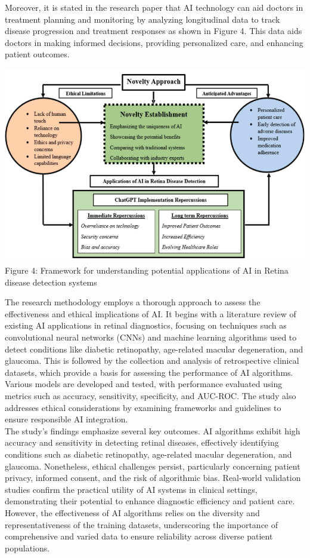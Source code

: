 \documentclass[a4paper, 12pt]{article}
\begin{document}
Moreover, it is stated in the research paper that AI technology can aid doctors in treatment planning and monitoring by analyzing longitudinal data to track disease progression and treatment responses as shown in Figure 4. This data aids doctors in making informed decisions, providing personalized care, and enhancing patient outcomes.

\begin{center}
\includegraphics[scale=0.73]{Figure4.png}\\
\small Figure 4: Framework for understanding potential applications of AI in Retina disease detection systems \normalsize
\end{center}

The research methodology employs a thorough approach to assess the effectiveness and ethical implications of AI. It begins with a literature review of existing AI applications in retinal diagnostics, focusing on techniques such as convolutional neural networks (CNNs) and machine learning algorithms used to detect conditions like diabetic retinopathy, age-related macular degeneration, and glaucoma. This is followed by the collection and analysis of retrospective clinical datasets, which provide a basis for assessing the performance of AI algorithms. Various models are developed and tested, with performance evaluated using metrics such as accuracy, sensitivity, specificity, and AUC-ROC. The study also addresses ethical considerations by examining frameworks and guidelines to ensure responsible AI integration.\\

The study's findings emphasize several key outcomes. AI algorithms exhibit high accuracy and sensitivity in detecting retinal diseases, effectively identifying conditions such as diabetic retinopathy, age-related macular degeneration, and glaucoma. Nonetheless, ethical challenges persist, particularly concerning patient privacy, informed consent, and the risk of algorithmic bias. Real-world validation studies confirm the practical utility of AI systems in clinical settings, demonstrating their potential to enhance diagnostic efficiency and patient care. However, the effectiveness of AI algorithms relies on the diversity and representativeness of the training datasets, underscoring the importance of comprehensive and varied data to ensure reliability across diverse patient populations.\\
\end{document}
